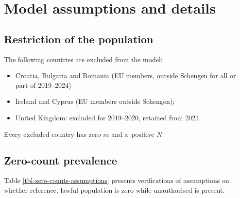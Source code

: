 \section{Model assumptions and
details}\label{sec-appendix-model-details}



\subsection{Restriction of the population}\label{sec-appen-restriction}

The following countries are excluded from the model:

\begin{itemize}
  \item Croatia, Bulgaria and Romania (EU members, outside
        Schengen for all or part of 2019--2024)
  \item Ireland and Cyprus (EU members outside Schengen);
  \item United Kingdom: excluded for 2019--2020, retained from 2021.
\end{itemize}

Every excluded country has zero $m$ and a~positive $N$. 

\subsection{Zero-count prevalence}\label{sec-appendix-zero-counts}


Table \ref{tbl-zero-counts-assumptions} presents verifications of assumptions on whether reference, lawful population is zero while unauthorised is present. 


